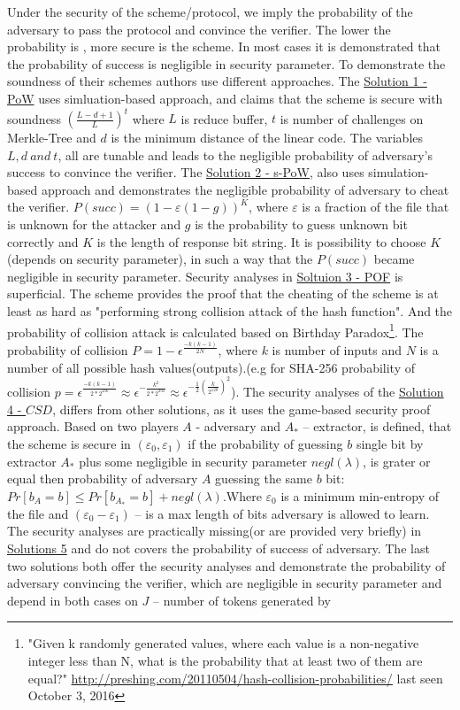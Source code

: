 \documentclass[12pt]{article}
\begin{document}
\noindent Under the security of the scheme/protocol, we imply the probability of the adversary to pass the protocol and convince the verifier. The lower the probability is , more secure is the scheme. In most cases it is demonstrated that the probability of success is negligible in security parameter. To demonstrate the soundness of their schemes authors use different approaches. The \hyperref[sub:Soltuion1] {Solution 1 - PoW} uses simluation-based approach, and claims that the scheme is secure with soundness  $\left( \frac{L-d+1}{L}\right)^t$ where $L$ is reduce buffer, $t$ is number of challenges on Merkle-Tree and $d$ is the minimum distance of the linear code. The variables $L,d\ and\ t$, all are tunable and leads to the negligible probability of adversary's success to convince the verifier. The \hyperref[sub:Soltuion2] {Solution 2 - s-PoW}, also uses  simulation-based approach and demonstrates the negligible probability of adversary to cheat the verifier. $P(succ) = (1-\varepsilon(1-g))^K$, where $\varepsilon$ is a fraction of the file that is unknown for the attacker and $g$ is the probability to guess unknown bit correctly and $K$ is the length of response bit string. It is possibility to choose $K$ (depends on security parameter), in such a way that the $P(succ)$ became negligible in security parameter. Security analyses in \hyperref[sub:Soltuion3]{Soltuion 3 - POF} is superficial. The scheme  provides the proof that the cheating of the scheme is at least as hard as "performing strong collision attack of the hash function". And the probability of collision attack is calculated based on Birthday Paradox\footnote{"Given k randomly generated values, where each value is a non-negative integer less than N, what is the probability that at least two of them are equal?" \url{http://preshing.com/20110504/hash-collision-probabilities/} last seen October 3, 2016}. The probability of collision $P=1- \epsilon^{\frac{-k(k-1)}{2N}}$, where $k$ is number of inputs and $N$ is a number of all possible hash values(outputs).(e.g for SHA-256 probability of collision $p=\epsilon^{\frac{-k(k-1)}{2* 2^{256}}}\approx\epsilon^{-\frac{k^2}{2* 2^{256}}}\approx\epsilon^{-\frac{1}{2}( \frac{k}{2^{128}})^2}$). The security analyses of the   \hyperref[sub:Soltuion4]{Solution 4 - $CSD$}, differs from other solutions, as it uses the game-based security proof approach. Based on  two players $A$ - adversary and $A_*$ -- extractor, is defined, that the scheme is secure in $(\varepsilon_0, \varepsilon_1)$ if the probability of guessing $b$ single bit by extractor $A_*$ plus some negligible in security parameter $negl(\lambda)$, is grater or equal then probability of adversary $A$ guessing the same $b$ bit: $Pr[b_A=b]\leq Pr[b_{A_*}=b]+negl(\lambda)$.Where $\varepsilon_0$ is a minimum min-entropy of the file and $(\varepsilon_0 - \varepsilon_1 )$ – is a max length of bits adversary is allowed to learn. The security analyses are practically missing(or are provided very briefly) in  \hyperref[sub:Soltuion5]{Solutions 5} and do not covers the probability of success of adversary. The last two solutions both offer the security analyses and demonstrate the probability of adversary convincing the verifier, which are negligible in security parameter and depend in both cases on $J$ -- number of tokens generated by 
\end{document}
